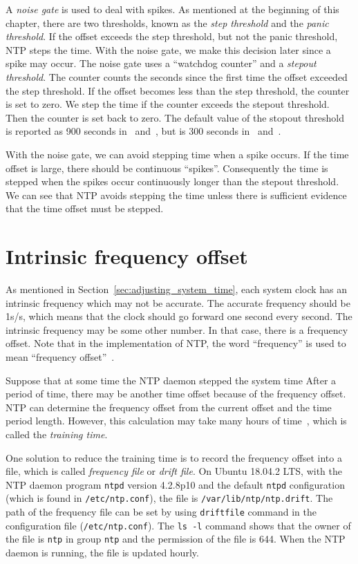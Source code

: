 A \emph{noise gate} is used to deal with spikes. As mentioned at the beginning 
of this chapter, there are two thresholds, known as the \emph{step threshold}
and the
\emph{panic threshold}. If the offset exceeds the step threshold, but not the
panic threshold, NTP steps the time. With the noise gate, we make this decision
later since a spike may occur. The noise gate uses a ``watchdog counter'' and a
\emph{stepout threshold}. The counter counts the seconds since the first time
the offset exceeded the step threshold. If the offset becomes less than the step
threshold, the counter is set to zero. We step the time if the counter exceeds
the stepout threshold. Then the counter is set back to zero. The default value
of the stopout threshold is reported as 900 seconds in~\cite{redbook}
and~\cite{rfc5905}, but is 300 seconds in~\cite{source_code}
and~\cite{clock_state_machine}. 

With the noise gate, we can avoid stepping time when a spike occurs. If the
time offset is large, there should be continuous ``spikes''. Consequently the
time is stepped when the spikes
occur continuously longer than the stepout threshold. We can see
that NTP avoids stepping the time unless there is sufficient evidence that the
time offset must be stepped. 

\section{Intrinsic frequency offset}%
\label{sec:intrinsic_frequency_offset}
As mentioned in Section~\ref{sec:adjusting_system_time}, each system clock has an
intrinsic frequency which may not be accurate. The accurate frequency should be
1s/s, which means that the clock should go forward one second every second. The
intrinsic frequency may be some other number. In that case, there is a
frequency offset. Note that in the implementation of NTP\null, the word
``frequency'' is used to mean ``frequency offset''~\cite{source_code}. 

Suppose that at some time the NTP daemon stepped the system time After a period
of time, there may be another time offset because of the frequency offset. NTP
can determine the frequency offset from the current offset and the time period
length.  However, this calculation may take many hours of time~\cite{redbook},
which is called the \emph{training time}. 

One solution to reduce the training time is to record the frequency offset into a file,
which is called \emph{frequency file} or \emph{drift file}. On Ubuntu 18.04.2
LTS, with the NTP
daemon program \verb|ntpd| version 4.2.8p10 and the default \verb|ntpd|
configuration (which is found in \verb|/etc/ntp.conf|), the file is
\verb|/var/lib/ntp/ntp.drift|. The path of the frequency file can be set by
using \verb|driftfile| command in the configuration file
(\verb|/etc/ntp.conf|). The \verb|ls -l| command shows that the owner of
the file is \verb|ntp| in group \verb|ntp| and the permission of the file is
644. When the NTP daemon is running, the file is updated hourly.

